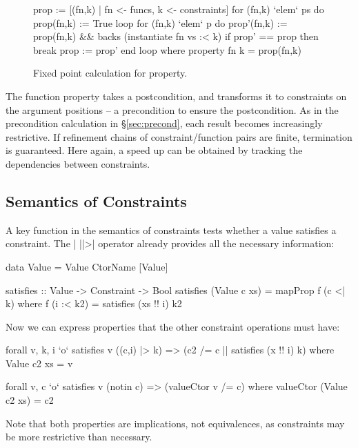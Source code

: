 \documentclass[preprint]{sigplanconf}
\newcommand{\C}[1]{\textsf{#1}}
\begin{document}
\begin{figure}
\begin{code}
prop := [(fn,k) | fn <- funcs, k <- constraints]
for (fn,k) `elem` ps do prop(fn,k) := True
loop
    for (fn,k) `elem` p do
        prop'(fn,k) := prop(fn,k) && backs (instantiate fn vs :< k)
    if prop' == prop then break
    prop := prop'
end loop
    where
        property fn k = prop(fn,k)
\end{code}
\caption{Fixed point calculation for \C{property}.}
\label{fig:property_fixp}
\end{figure}

The function \C{property} takes a postcondition, and transforms it to constraints on the argument positions -- a precondition to ensure the postcondition. As in the precondition calculation in \S\ref{sec:precond}, each result becomes increasingly restrictive. If refinement chains of constraint/function pairs are finite, termination is guaranteed. Here again, a speed up can be obtained by tracking the dependencies between constraints.

\subsection{Semantics of Constraints}

A key function in the semantics of constraints tests whether a value satisfies a constraint. The | ||>| operator already provides all the necessary information:

\noindent\begin{minipage}{\linewidth}
\begin{code}
data Value = Value CtorName [Value]

satisfies :: Value -> Constraint -> Bool
satisfies (Value c xs) = mapProp f (c <| k)
    where f (i :< k2) = satisfies (xs !! i) k2
\end{code}
\end{minipage}

Now we can express properties that the other constraint operations must have:

\begin{code}
forall v, k, i  `o` satisfies v ((c,i) |> k)
                => (c2 /= c || satisfies (x !! i) k)
    where Value c2 xs = v

forall v, c `o` satisfies v (notin c) => (valueCtor v /= c)
    where valueCtor (Value c2 xs) = c2
\end{code}

\noindent Note that both properties are implications, not equivalences, as constraints may be more restrictive than necessary.
\end{document}
